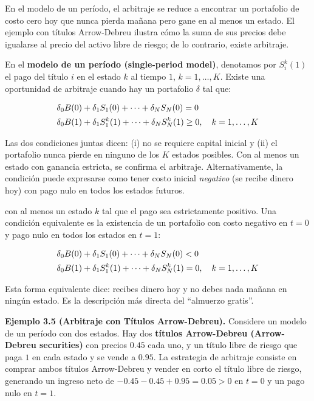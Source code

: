 \documentclass[12pt]{article}
\begin{document}
\begin{intuicion}
En el modelo de un per\'iodo, el arbitraje se reduce a encontrar un portafolio de costo cero hoy que nunca pierda ma\~nana pero gane en al menos un estado. El ejemplo con t\'itulos Arrow-Debreu ilustra c\'omo la suma de sus precios debe igualarse al precio del activo libre de riesgo; de lo contrario, existe arbitraje.
\end{intuicion}

En el \textbf{modelo de un per\'iodo (single-period model)}, denotamos por $S_i^k(1)$ el pago del t\'itulo $i$ en el estado $k$ al tiempo $1$, $k=1,\ldots,K$. Existe una oportunidad de arbitraje cuando hay un portafolio $\delta$ tal que:

\begin{align}
  &\delta_0 B(0) + \delta_1 S_1(0) + \cdots + \delta_N S_N(0) = 0 \notag \\
  &\delta_0 B(1) + \delta_1 S_1^k(1) + \cdots + \delta_N S_N^k(1) \ge 0, \quad k = 1,\ldots,K
\end{align}

\begin{intuicionmat}
Las dos condiciones juntas dicen: (i) no se requiere capital inicial y (ii) el portafolio nunca pierde en ninguno de los $K$ estados posibles. Con al menos un estado con ganancia estricta, se confirma el arbitraje. Alternativamente, la condici\'on puede expresarse como tener costo inicial \textit{negativo} (se recibe dinero hoy) con pago nulo en todos los estados futuros.
\end{intuicionmat}

con al menos un estado $k$ tal que el pago sea estrictamente positivo. Una condici\'on equivalente es la existencia de un portafolio con costo negativo en $t=0$ y pago nulo en todos los estados en $t=1$:

\begin{align}
  &\delta_0 B(0) + \delta_1 S_1(0) + \cdots + \delta_N S_N(0) < 0 \notag \\
  &\delta_0 B(1) + \delta_1 S_1^k(1) + \cdots + \delta_N S_N^k(1) = 0, \quad k = 1,\ldots,K
\end{align}

\begin{intuicionmat}
Esta forma equivalente dice: recibes dinero hoy y no debes nada ma\~nana en ning\'un estado. Es la descripci\'on m\'as directa del ``almuerzo gratis''.
\end{intuicionmat}

\textbf{Ejemplo 3.5 (Arbitraje con T\'itulos Arrow-Debreu).} Considere un modelo de un per\'iodo con dos estados. Hay dos \textbf{t\'itulos Arrow-Debreu (Arrow-Debreu securities)} con precios $0.45$ cada uno, y un t\'itulo libre de riesgo que paga $1$ en cada estado y se vende a $0.95$. La estrategia de arbitraje consiste en comprar ambos t\'itulos Arrow-Debreu y vender en corto el t\'itulo libre de riesgo, generando un ingreso neto de $-0.45 - 0.45 + 0.95 = 0.05 > 0$ en $t=0$ y un pago nulo en $t=1$.
\end{document}
